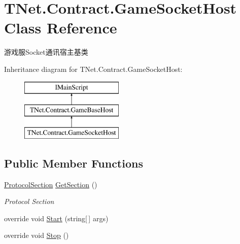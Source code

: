 \hypertarget{class_t_net_1_1_contract_1_1_game_socket_host}{}\section{T\+Net.\+Contract.\+Game\+Socket\+Host Class Reference}
\label{class_t_net_1_1_contract_1_1_game_socket_host}


游戏服\+Socket通讯宿主基类  


Inheritance diagram for T\+Net.\+Contract.\+Game\+Socket\+Host\+:\begin{figure}[H]
\begin{center}
\leavevmode
\includegraphics[height=3.000000cm]{class_t_net_1_1_contract_1_1_game_socket_host}
\end{center}
\end{figure}
\subsection*{Public Member Functions}
\begin{DoxyCompactItemize}
\item 
\mbox{\hyperlink{class_t_net_1_1_config_1_1_protocol_section}{Protocol\+Section}} \mbox{\hyperlink{class_t_net_1_1_contract_1_1_game_socket_host_a662ddf36bacde03ccc6089d183161652}{Get\+Section}} ()
\begin{DoxyCompactList}\small\item\em Protocol Section \end{DoxyCompactList}\item 
override void \mbox{\hyperlink{class_t_net_1_1_contract_1_1_game_socket_host_a5ed0b1074c4e59abb3ff7e60eee2ceec}{Start}} (string\mbox{[}$\,$\mbox{]} args)
\item 
override void \mbox{\hyperlink{class_t_net_1_1_contract_1_1_game_socket_host_a598542dacf31acc5a7a7602ff14a0b73}{Stop}} ()
\end{DoxyCompactItemize}
